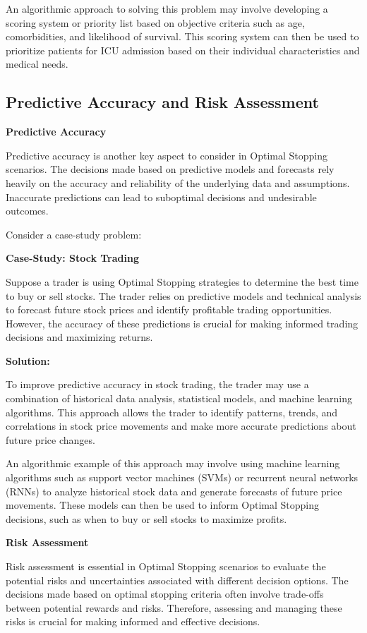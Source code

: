 \documentclass[12pt]{book} %
\begin{document}
An algorithmic approach to solving this problem may involve developing a scoring system or priority list based on objective criteria such as age, comorbidities, and likelihood of survival. This scoring system can then be used to prioritize patients for ICU admission based on their individual characteristics and medical needs.

\subsection{Predictive Accuracy and Risk Assessment}

\textbf{Predictive Accuracy}

Predictive accuracy is another key aspect to consider in Optimal Stopping scenarios. The decisions made based on predictive models and forecasts rely heavily on the accuracy and reliability of the underlying data and assumptions. Inaccurate predictions can lead to suboptimal decisions and undesirable outcomes.

Consider a case-study problem:

\textbf{Case-Study: Stock Trading}

Suppose a trader is using Optimal Stopping strategies to determine the best time to buy or sell stocks. The trader relies on predictive models and technical analysis to forecast future stock prices and identify profitable trading opportunities. However, the accuracy of these predictions is crucial for making informed trading decisions and maximizing returns.

\textbf{Solution:}

To improve predictive accuracy in stock trading, the trader may use a combination of historical data analysis, statistical models, and machine learning algorithms. This approach allows the trader to identify patterns, trends, and correlations in stock price movements and make more accurate predictions about future price changes.

An algorithmic example of this approach may involve using machine learning algorithms such as support vector machines (SVMs) or recurrent neural networks (RNNs) to analyze historical stock data and generate forecasts of future price movements. These models can then be used to inform Optimal Stopping decisions, such as when to buy or sell stocks to maximize profits.

\textbf{Risk Assessment}

Risk assessment is essential in Optimal Stopping scenarios to evaluate the potential risks and uncertainties associated with different decision options. The decisions made based on optimal stopping criteria often involve trade-offs between potential rewards and risks. Therefore, assessing and managing these risks is crucial for making informed and effective decisions.
\end{document}
